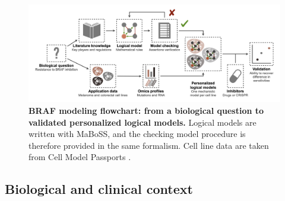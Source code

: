 \documentclass[a4paper,12pt,twoside,onecolumn,openright,final,oldfontcommands]{memoir}
\begin{document}
\begin{figure}

{\centering \includegraphics[width=0.9\linewidth]{fig/BRAF-GA} 

}

\caption[BRAF modeling flowchart: from a biological question to validated personalized logical models]{\textbf{BRAF modeling flowchart: from a biological
question to validated personalized logical models.} Logical models are
written with MaBoSS, and the checking model procedure is therefore
provided in the same formalism. Cell line data are taken from Cell Model
Passports \citep{van2019cell}.}\label{fig:BRAF-GA}
\end{figure}







\subsection{Biological and clinical
context}\label{biological-and-clinical-context}
\end{document}
